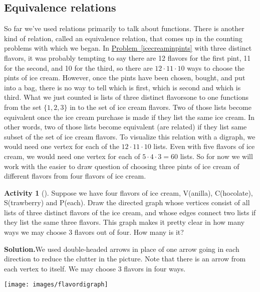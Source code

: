 \documentclass[10pt,]{book}
\theoremstyle{plain}
\theoremstyle{definition}
\newtheorem{activity}[project]{Activity}
\numberwithin{equation}{chapter}
\begin{document}
\subsection[{Equivalence relations}]{Equivalence relations}\label{equivalencerelations}
So far we've used relations primarily to talk about functions. There is another kind of relation, called an equivalence relation, that comes up in the counting problems with which we began. In \hyperref[icecreaminpints]{Problem~\ref{icecreaminpints}} with three distinct flavors, it was probably tempting to say there are 12 flavors for the first pint, 11 for the second, and 10 for the third, so there are \(12\cdot 11\cdot 10\) ways to choose the pints of ice cream. However, once the pints have been chosen, bought, and put into a bag, there is no way to tell which is first, which is second and which is third. What we just counted is lists of three distinct flavors\textemdash{}one to one functions from the set \(\{1,2,3\}\) in to the set of ice cream flavors. Two of those lists become equivalent once the ice cream purchase is made if they list the same ice cream. In other words, two of those lists become equivalent (are related) if they list same subset of the set of ice cream flavors. To visualize this relation with a digraph, we would need one vertex for each of the \(12\cdot 11\cdot 10\) lists. Even with five flavors of ice cream, we would need one vertex for each of \(5\cdot4\cdot3=60\) lists. So for now we will work with the easier to draw question of choosing three pints of ice cream of different flavors from four flavors of ice cream.%
\begin{activity}[]\label{fourchoosethree}
Suppose we have four flavors of ice cream, V(anilla), C(hocolate), S(trawberry) and P(each). Draw the directed graph whose vertices consist of all lists of three distinct flavors of the ice cream, and whose edges connect two lists if they list the same three flavors. This graph makes it pretty clear in how many ways we may choose 3 flavors out of four. How many is it?%
\par\medskip\noindent%
\textbf{Solution.}\quad We used double-headed arrows in place of one arrow going in each direction to reduce the clutter in the picture. Note that there is an arrow from each vertex to itself. We may choose 3 flavors in four ways.%
\par
\texttt{[image: images/flavordigraph]}
%
\end{activity}
\end{document}
